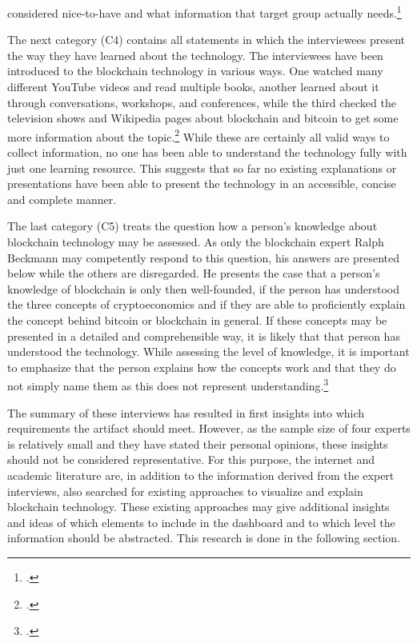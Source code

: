 considered nice-to-have and what information that target group actually needs.\footcites[Cf.][P80, P81, P87]{BjoernPaulewicz_Interview}[cf.][P120]{RalphBeckmann_Interview}

The next category (C4) contains all statements in which the interviewees present the way they have learned about the technology. The interviewees have been introduced to the blockchain technology in various ways. One watched many different YouTube videos and read multiple books, another learned about it through conversations, workshops, and conferences, while the third checked the television shows and Wikipedia pages about blockchain and bitcoin to get some more information about the topic.\footcites[Cf.][P6]{BjoernPaulewicz_Interview}[cf.][P72, P90]{BjoernPaulewicz_Interview}[cf.][P93, P94, P101]{RalphBeckmann_Interview} While these are certainly all valid ways to collect information, no one has been able to understand the technology fully with just one learning resource. This suggests that so far no existing explanations or presentations have been able to present the technology in an accessible, concise and complete manner.

The last category (C5) treats the question how a person's knowledge about blockchain technology may be assessed. As only the blockchain expert Ralph Beckmann may competently respond to this question, his answers are presented below while the others are disregarded. He presents the case that a person's knowledge of blockchain is only then well-founded, if the person has understood the three concepts of cryptoeconomics and if they are able to proficiently explain the concept behind bitcoin or blockchain in general. If these concepts may be presented in a detailed and comprehensible way, it is likely that that person has understood the technology. While assessing the level of knowledge, it is important to emphasize that the person explains how the concepts work and that they do not simply name them as this does not represent understanding.\footcites[Cf.][P100, P102, P108, P111, P118, P129, P130]{RalphBeckmann_Interview}

The summary of these interviews has resulted in first insights into which requirements the artifact should meet. However, as the sample size of four experts is relatively small and they have stated their personal opinions, these insights should not be considered representative. For this purpose, the internet and academic literature are, in addition to the information derived from the expert interviews, also searched for existing approaches to visualize and explain blockchain technology. These existing approaches may give additional insights and ideas of which elements to include in the dashboard and to which level the information should be abstracted. This research is done in the following section.

